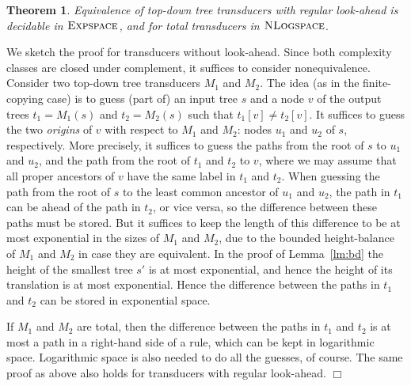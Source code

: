 \documentclass[copyright,creativecommons]{eptcs}
\newtheorem{theorem}{Theorem}
\newcommand{\eop}{\hspace*{\fill}$\Box$}
\newenvironment{proof}{{\it Proof.}\quad}{\eop\vspace*{4mm}}
\newcommand{\expspace}{\textsc{Expspace}}
\newcommand{\nlogspace}{\textsc{NLogspace}}
\begin{document}
\begin{theorem}\rm\label{theo:j}
Equivalence of top-down tree transducers with
regular look-ahead is decidable in $\expspace$, and for
total transducers in $\nlogspace$.
\end{theorem}
\begin{proof}
We sketch the proof for transducers without look-ahead.
Since both complexity classes are closed under complement,
it suffices to consider nonequivalence.
Consider two top-down tree transducers $M_1$ and $M_2$. 
The idea (as in the finite-copying case)
is to guess (part of) an input tree $s$ and a node $v$ of the output trees
$t_1=M_1(s)$ and $t_2=M_2(s)$ such that $t_1[v]\neq t_2[v]$. 
It suffices to guess
the two \emph{origins} of $v$ with respect to $M_1$ and $M_2$: nodes $u_1$ and $u_2$ 
of $s$, respectively.
More precisely, it suffices to guess the paths from the root of $s$
to $u_1$ and $u_2$, and the path from the root of $t_1$ and $t_2$ to $v$,
where we may assume that all proper ancestors of $v$ have the same label
in $t_1$ and $t_2$. When guessing the path from the root of $s$ to the least
common ancestor of $u_1$ and $u_2$, the path in $t_1$ can be ahead of the path
in $t_2$, or vice versa, so the difference between these paths must be
stored. But it suffices to keep the length of this difference to be
at most exponential in the sizes of $M_1$ and $M_2$, due to the bounded
height-balance of $M_1$ and $M_2$ in case they are equivalent. 
In the proof of Lemma~\ref{lm:bd}
the height of the smallest tree $s'$ is at most exponential, and hence
the height of its translation is at most exponential. Hence the
difference between the paths in $t_1$ and $t_2$ can be stored in exponential
space. 

If $M_1$ and $M_2$ are total, then the difference between the paths in $t_1$
and $t_2$ is at most a path in a right-hand side of a rule, which can be kept in
logarithmic space. Logarithmic space is also needed to do all the
guesses, of course.
The same proof as above also holds for transducers with regular look-ahead.
\end{proof}
\end{document}
